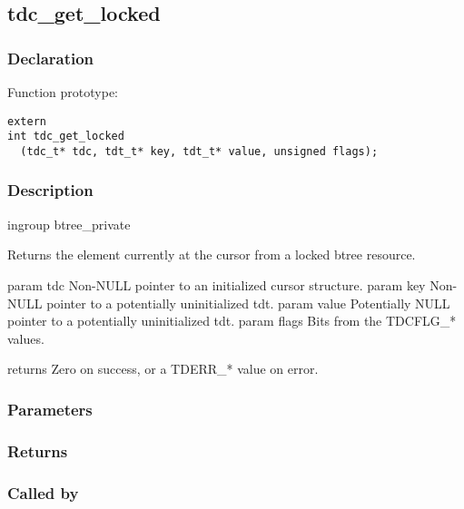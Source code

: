 
\newpage
\subsection{tdc\_get\_locked}
\subsubsection{Declaration} Function prototype:

\begin{verbatim}
extern
int tdc_get_locked
  (tdc_t* tdc, tdt_t* key, tdt_t* value, unsigned flags);
\end{verbatim}

\subsubsection{Description}


 ingroup btree\_private

 Returns the element currently at the cursor from a locked btree resource.

 param tdc Non-NULL pointer to an initialized cursor structure.
 param key Non-NULL pointer to a potentially uninitialized tdt.
 param value Potentially NULL pointer to a potentially uninitialized tdt.
 param flags Bits from the TDCFLG\_* values.

 returns Zero on success, or a TDERR\_* value on error.
 

\subsubsection{Parameters}
\subsubsection{Returns}
\subsubsection{Called by}

